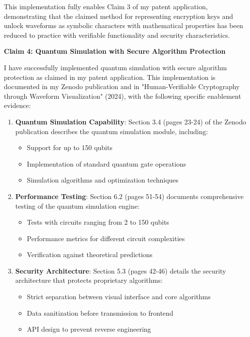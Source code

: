 \documentclass[12pt,letterpaper]{article}
\newcommand{\sectionheading}[1]{\noindent\textbf{#1}\par\vspace{0.25in}}
\begin{document}
\noindent This implementation fully enables Claim 3 of my patent application, demonstrating that the claimed method for representing encryption keys and unlock waveforms as symbolic characters with mathematical properties has been reduced to practice with verifiable functionality and security characteristics.

\newpage
\sectionheading{Claim 4: Quantum Simulation with Secure Algorithm Protection}

\noindent I have successfully implemented quantum simulation with secure algorithm protection as claimed in my patent application. This implementation is documented in my Zenodo publication and in "Human-Verifiable Cryptography through Waveform Visualization" (2024), with the following specific enablement evidence:

\begin{enumerate}[label=\arabic*.]
\item \textbf{Quantum Simulation Capability}: Section 3.4 (pages 23-24) of the Zenodo publication describes the quantum simulation module, including:
   \begin{itemize}
   \item Support for up to 150 qubits
   \item Implementation of standard quantum gate operations
   \item Simulation algorithms and optimization techniques
   \end{itemize}

\item \textbf{Performance Testing}: Section 6.2 (pages 51-54) documents comprehensive testing of the quantum simulation engine:
   \begin{itemize}
   \item Tests with circuits ranging from 2 to 150 qubits
   \item Performance metrics for different circuit complexities
   \item Verification against theoretical predictions
   \end{itemize}

\item \textbf{Security Architecture}: Section 5.3 (pages 42-46) details the security architecture that protects proprietary algorithms:
   \begin{itemize}
   \item Strict separation between visual interface and core algorithms
   \item Data sanitization before transmission to frontend
   \item API design to prevent reverse engineering
   \end{itemize}


\end{enumerate}
\end{document}
